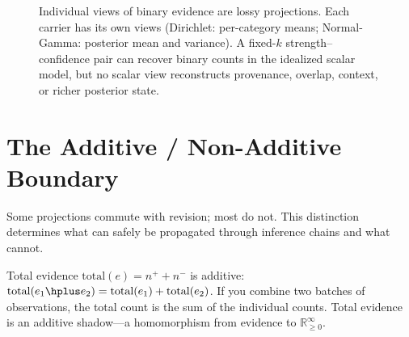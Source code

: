\documentclass[11pt,openany]{report}
\begin{document}
\begin{figure}[htbp]
\centering
{}
\caption{Individual views of binary evidence are lossy projections.  Each carrier
has its own views (Dirichlet: per-category means; Normal-Gamma:
posterior mean and variance).  A fixed-$k$ strength--confidence pair
can recover binary counts in the idealized scalar model, but no scalar
view reconstructs provenance, overlap, context, or richer posterior
state.}
\label{fig:tv-views-projections}
\end{figure}


\section{The Additive / Non-Additive Boundary}

Some projections commute with revision; most do not.  This
distinction determines what can safely be propagated through
inference chains and what cannot.

Total evidence $\mathrm{total}(e) = n^+ + n^-$ is additive:
$\mathrm{total}(e_1 \hplus e_2) = \mathrm{total}(e_1) +
\mathrm{total}(e_2)$.  If you combine two batches of observations,
the total count is the sum of the individual counts.  Total evidence
is an additive shadow---a homomorphism from evidence to
$\mathbb{R}_{\ge 0}^\infty$.
\end{document}
